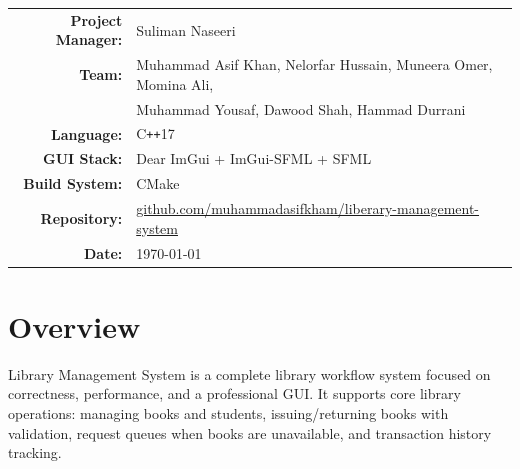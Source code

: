 \documentclass[11pt,a4paper]{article}
\newcommand{\ProjectName}{Library Management System}
\newcommand{\Cpp}{C\texttt{++}17}
\begin{document}
\begin{titlepage}
  \vfill
\begin{tabular}{rl}
    \textbf{Project Manager:} & Suliman Naseeri \\
    \textbf{Team:} & Muhammad Asif Khan, Nelorfar Hussain, Muneera Omer, Momina Ali, \\
                   & Muhammad Yousaf, Dawood Shah, Hammad Durrani \\
    \textbf{Language:} & \Cpp \\
    \textbf{GUI Stack:} & Dear ImGui + ImGui-SFML + SFML \\
    \textbf{Build System:} & CMake \\
    \textbf{Repository:} & \href{https://github.com/muhammadasifkham/liberary-management-system}{github.com/muhammadasifkham/liberary-management-system} \\
    \textbf{Date:} & \today \\
  \end{tabular}

  \vspace{1.0cm}
\end{titlepage}

\tableofcontents
\newpage

\section{Overview}
\ProjectName{} is a complete library workflow system focused on correctness, performance, and a professional GUI.
It supports core library operations: managing books and students, issuing/returning books with validation, request queues when books are unavailable, and transaction history tracking.
\end{document}
